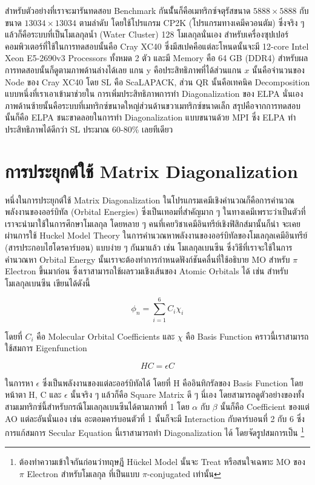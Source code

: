 สำหรับตัวอย่างที่เราจะมารันทดสอบ Benchmark กันนัั้นก็คือเมทริกซ์จตุรัสขนาด $5888 \times 5888$ กับขนาด $13034 \times 13034$ 
ตามลำดับ โดยใช้โปรแกรม CP2K (โปรแกรมทางเคมีควอนตัม) ซึ่งจริง ๆ แล้วก็คือระบบที่เป็นโมเลกุลน้ำ (Water Cluster) 128 โมเลกุลนั่นเอง
สำหรับเครื่องซุปเปอร์คอมพิวเตอร์ที่ใช้ในการทดสอบนั้นคือ Cray XC40 ซึ่งมีสเปคคือแต่ละโหนดนั้นจะมี 12-core Intel Xeon E5-2690v3 Processors 
ทั้งหมด 2 ตัว และมี Memory คือ 64 GB (DDR4) สำหรับผลการทดสอบนั้นก็ดูตามภาพด้านล่างได้เลย แกน y คือประสิทธิภาพที่ได้ส่วนแกน $x$ 
นั้นคือจำนวนของ Node ของ Cray XC40 โดย SL คือ ScaLAPACK, ส่วน QR นั้นคือเทคนิค Decomposition แบบหนึ่งที่เราเอาเข้ามาช่วยใน%
การเพิ่มประสิทธิภาพการทำ Diagonalization ของ ELPA นั่นเอง ภาพด้านซ้ายนั้นคือระบบที่เมทริกซ์ขนาดใหญ่ส่วนด้านขวาเมทริกซ์ขนาดเล็ก
สรุปคือจากการทดสอบนั้นก็คือ ELPA ชนะขาดลอยในการทำ Diagonalization แบบขนานด้วย MPI ซึ่ง ELPA ทำประสิทธิภาพได้ดีกว่า SL 
ประมาณ 60-80\% เลยทีเดียว

\section{การประยุกต์ใช้ Matrix Diagonalization}

หนึ่งในการประยุกต์ใช้ Matrix Diagonalization ในโปรแกรมเคมีเชิงคำนวณก็คือการคำนวณพลังงานของออร์บิทัล (Orbital Energies) 
ซึ่งเป็นเทอมที่สำคัญมาก ๆ ในทางเคมีเพราะว่าเป็นตัวที่เราจะนำมาใช้ในการศึกษาโมเลกุล โดยหลาย ๆ คนที่เคยวิชาเคมีอินทรีย์เชิงฟิสิกส์มานั้นก็น่า%
จะเคยผ่านการใช้ Huckel Model Theory ในการคำนวณหาพลังงานของออร์บิทัลของโมเลกุลเคมีอินทรีย์ (สารประกอบไฮโดรคาร์บอน) แบบง่าย ๆ 
กันมาแล้ว เช่น โมเลกุลเบนซีน ซึ่งวิธีที่เราจะใช้ในการคำนวณหา Orbital Energy นั้นเราจะต้องทำการกำหนดฟังก์ชันคลื่นที่ใช้อธิบาย MO สำหรับ 
$\pi$ Electron ขึ้นมาก่อน ซึ่งเราสามารถใช้ผลรวมเชิงเส้นของ Atomic Orbitals ได้ เช่น สำหรับโมเลกุลเบนซีน เขียนได้ดังนี้ 

\begin{equation}
    \phi_{n} = \sum_{i=1}^{6} C_{i} \chi_{i} 
\end{equation}

โดยที่ $C_{i}$ คือ Molecular Orbital Coefficients และ $\chi$ คือ Basis Function คราวนี้เราสามารถใช้สมการ Eigenfunction

\begin{equation}    
    HC = \epsilon C
\end{equation}

\noindent ในการหา $\epsilon$ ซึ่งเป็นพลังงานของแต่ละออร์บิทัลได้ โดยที่ H คืออินทิกรัลของ Basis Function โดยหน้าตา H, C และ 
$\epsilon$ นั้นจริง ๆ แล้วก็คือ Square Matrix ดี ๆ นี่เอง โดยสามารถดูตัวอย่างของทั้งสามเมทริกซ์นี้สำหรับกรณีโมเลกุลเบนซีนได้ตามภาพที่ 1 
โดย $\alpha$ กับ $\beta$ นั้นก็คือ Coefficient ของแต่ AO แต่ละอันนั่นเอง เช่น อะตอมคาร์บอนตัวที่ 1 นั้นก็จะมี Interaction 
กับคาร์บอนที่ 2 กับ 6 ซึ่งการแก้สมการ Secular Equation นี้เราสามารถทำ Diagonalization ได้ โดยจัดรูปสมการเป็น%
\footnote{ต้องทำความเข้าใจกันก่อนว่าทฤษฎี H\"{u}ckel Model นั้นจะ Treat หรือสนใจเฉพาะ MO ของ $\pi$ Electron สำหรับโมเลกุล%
ที่เป็นแบบ $\pi$-conjugated เท่านั้น} 

